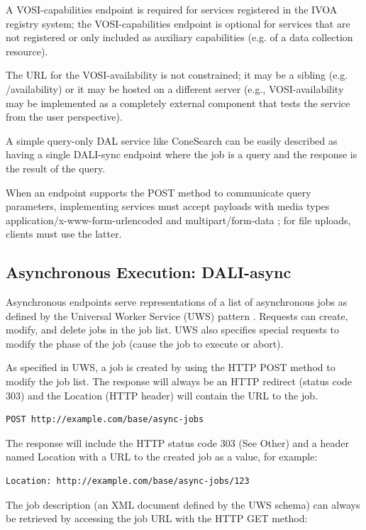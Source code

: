 \documentclass[11pt,letter]{ivoa}
\begin{document}
A VOSI-capabilities endpoint is required for services registered in the IVOA registry system;
the VOSI-capabilities endpoint is optional for services that are not registered
or only included as auxiliary capabilities (e.g. of a data collection resource).

The URL for the VOSI-availability is not constrained; it may be a sibling (e.g. /availability)
or it may be hosted on a different server (e.g., VOSI-availability may be implemented as a
completely external component that tests the service from the user perspective).

A simple query-only DAL service like ConeSearch can be easily described as
having a single DALI-sync endpoint where the job is a query and the response is
the result of the query.

When an endpoint supports the POST method to communicate query
parameters, implementing services must accept payloads with media types
application/x-www-form-urlencoded \citep{std:RFC1866} and
multipart/form-data \citep{std:RFC7578}; for file uploads, clients must
use the latter.

\subsection{Asynchronous Execution: DALI-async}
\label{sec:dali-async}
Asynchronous endpoints serve representations of a list of asynchronous jobs
as defined by the Universal Worker Service (UWS) pattern \citep{2016ivoa.spec.1024H}.
Requests can
create, modify, and delete jobs in the job list. UWS also specifies special
requests to modify the phase of the job (cause the job to execute or abort).

As specified in UWS, a job is created by using the HTTP POST method to modify
the job list. The response will always be an HTTP redirect (status code 303) and
the Location (HTTP header) will contain the URL to the job.

\begin{verbatim}
POST http://example.com/base/async-jobs
\end{verbatim}

The response will include the HTTP status code 303 (See Other) and a header
named Location with a URL to the created job as a value, for example:

\begin{verbatim}
Location: http://example.com/base/async-jobs/123
\end{verbatim}

The job description (an XML document defined by the UWS schema) can always be
retrieved by accessing the job URL with the HTTP GET method:
\end{document}
